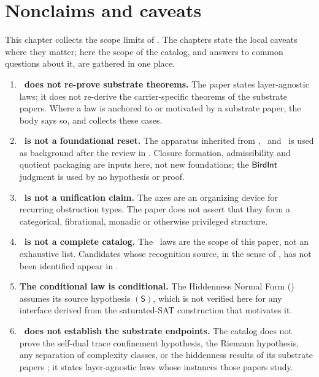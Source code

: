 \section{Nonclaims and caveats}\label{sec:nonclaims}

This chapter collects the scope limits of \FIV.  The chapters state the
local caveats where they matter; here the scope of the catalog, and
answers to common questions about it, are gathered in one place.

\begin{enumerate}[label=\textbf{N\arabic*.}, leftmargin=*]
\item \textbf{\FIV\ does not re-prove substrate theorems.}
The paper states layer-agnostic laws; it does not re-derive the
carrier-specific theorems of the substrate papers.  Where a law is
anchored to or motivated by a substrate paper, the body says so, and
 collects these cases.

\item \textbf{\FIV\ is not a foundational reset.}
The apparatus inherited from \FoundI, \FoundII\ and \FoundIII\ is used
as background after the review in .  Closure
formation, admissibility and quotient packaging are inputs here, not
new foundations; the \(\mathsf{BirdInt}\) judgment is used by no hypothesis or
proof.

\item \textbf{\FIV\ is not a unification claim.}
The axes are an organizing device for recurring obstruction types.  The
paper does not assert that they form a categorical, fibrational,
monadic or otherwise privileged structure.

\item \textbf{\FIV\ is not a complete catalog.}
The \NumLaws\ laws are the scope of this paper, not an exhaustive list.
Candidates whose recognition source, in the sense of
, has not been identified appear in
.

\item \textbf{The conditional law is conditional.}
The Hiddenness Normal Form () assumes its source hypothesis
\((\mathsf S)\), which is not verified here for any interface derived
from the saturated-SAT construction that motivates it.

\item \textbf{\FIV\ does not establish the substrate endpoints.}
The catalog does not prove the self-dual trace confinement hypothesis,
the Riemann hypothesis, any separation of complexity classes, or the
hiddenness results of its substrate papers
\citep{Tsiokos2026SDTC, Tsiokos2026RH, Tsiokos2026PvNP, Tsiokos2026CSL};
it states layer-agnostic laws whose instances those papers study.


\end{enumerate}
